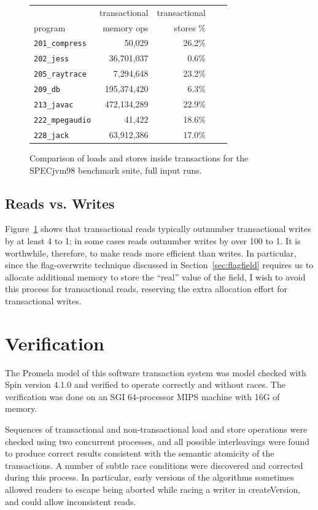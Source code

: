 \documentclass[12pt]{article}
\newcommand{\punt}[1]{}%
\newcommand{\sis}{\linespread{1.0}\setlength{\baselineskip}{0.8\baselineskip}}
\newcommand{\secput}[2]{\section{#2}\label{sec:#1}}
\newcommand{\figref}[1]         {Figure~\ref{fig:#1}}
\newcommand{\secref}[1]         {Section~\ref{sec:#1}}
\begin{document}
\begin{figure}\sis%
\begin{center}
\begin{tabular}{lrrrr}
        & transactional & transactional\\
program & memory ops    & stores \% \\\hline
{\tt 201\_compress} & 50,029 & 26.2\% \\
{\tt 202\_jess} & 36,701,037 & 0.6\% \\
{\tt 205\_raytrace} & 7,294,648 & 23.2\% \\
{\tt 209\_db} & 195,374,420 & 6.3\% \\
{\tt 213\_javac} & 472,134,289 & 22.9\% \\
{\tt 222\_mpegaudio} & 41,422 & 18.6\% \\
{\tt 228\_jack} & 63,912,386 & 17.0\% \\
\end{tabular}
\end{center}
\caption{Comparison of loads and stores inside transactions for the
  SPECjvm98 benchmark suite, full input runs.}
\label{fig:writepercent}
\end{figure}
\subsection{Reads vs. Writes}
\figref{writepercent} shows that transactional reads typically
outnumber transactional writes by at least 4 to 1; in some cases reads
outnumber writes by over 100 to 1.  It is worthwhile, therefore, to
make reads more efficient than writes.  In particular, since the
flag-overwrite technique discussed in \secref{flagfield} requires us
to allocate additional memory to store the ``real'' value of the
field, I wish to avoid this process for transactional reads,
reserving the extra allocation effort for transactional writes.

\punt{
\subsection{Large objects}
See \secref{properties}.
}

\secput{verification}{Verification}
The Promela model of this software transaction system was model
checked with Spin version 4.1.0 and verified to operate correctly and
without races.  The verification was done on an SGI 64-processor MIPS
machine with 16G of memory.

Sequences of transactional and non-transactional load and store
operations were checked using two concurrent processes, and all possible
interleavings were found to produce correct results consistent with
the semantic atomicity of the transactions.  A number of subtle race
conditions were discovered and corrected during this process.
In particular, early versions of the algorithms sometimes allowed
readers to escape being aborted while racing a writer in
createVersion, and could allow inconsistent reads.
\end{document}
